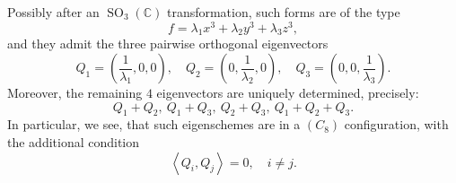 \documentclass{amsart}
\theoremstyle{plain}
\theoremstyle{definition}
\newcommand{\C}{\mathbb{C}}
\newcommand{\SO}{\operatorname{SO}}
\begin{document}
Possibly after an $\SO_3(\C)$ transformation, such forms are of the type
%
$$
  f = \lambda_1 x^3 +\lambda_2 y^3 + \lambda_3 z^3,
$$
%
and they admit the three pairwise orthogonal eigenvectors
%
$$
  Q_1 = (\frac{1}{\lambda_1},0,0), \quad
  Q_2 = (0,\frac{1}{\lambda_2},0), \quad
  Q_3 = (0,0,\frac{1}{\lambda_3}).
$$
%
Moreover, the remaining $4$ eigenvectors are uniquely determined, precisely:
%
$$
  Q_1+Q_2, \ Q_1+Q_3, \ Q_2+Q_3, \ Q_1+Q_2+Q_3.
$$
%
In particular, we see, that such eigenschemes are in a $(C_8)$ configuration, with the additional condition
%
$$
  \left\langle Q_i,Q_j \right\rangle = 0, \quad i \neq j.
$$
%



\end{document}
